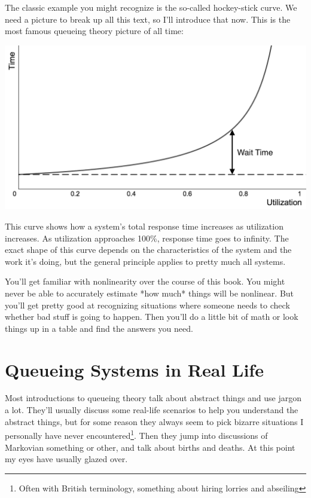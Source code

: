 \documentclass{vivid_layout_pdf}
\begin{document}
The classic example you might recognize is the so-called hockey-stick curve. We need a picture to break up all this text, so I'll introduce that now. This is the most famous queueing theory picture of all time:

\begin{center}
\includegraphics[width=.75\linewidth]{hockey-stick-1}
\end{center}

This curve shows how a system's total response time increases as utilization increases. As utilization approaches 100\%, response time goes to infinity. The exact shape of this curve depends on the characteristics of the system and the work it's doing, but the general principle applies to pretty much all systems.

You'll get familiar with nonlinearity over the course of this book. You might never be able to accurately estimate *how much* things will be nonlinear. But you'll get pretty good at recognizing situations where someone needs to check whether bad stuff is going to happen. Then you'll do a little bit of math or look things up in a table and find the answers you need.

\section{Queueing Systems in Real Life}	%

Most introductions to queueing theory talk about abstract things and use jargon a lot. They'll usually discuss some real-life scenarios to help you understand the abstract things, but for some reason they always seem to pick bizarre situations I personally have never encountered\footnote{Often with British terminology, something about hiring lorries and abseiling}. Then they jump into discussions of Markovian something or other, and talk about births and deaths. At this point my eyes have usually glazed over.
\end{document}

